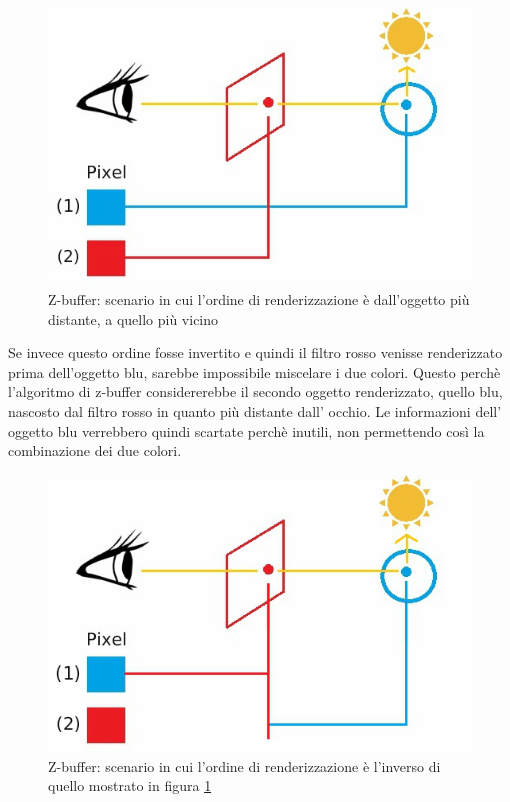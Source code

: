 \begin{figure}[htb]
 \centering
 \includegraphics[width=0.8\linewidth]{images/chapter_stato_arte/stato_arte_zbuffer_1.jpg}\hfill
 \caption[Z-buffer: ordine di renderizzazione corretto]{Z-buffer: scenario in cui l'ordine di renderizzazione è dall'oggetto più distante, a quello più vicino}
 \label{fig:stato_arte_zbuffer_1}
\end{figure}
 
Se invece questo ordine fosse invertito e quindi il filtro rosso venisse renderizzato prima dell’oggetto blu, sarebbe impossibile miscelare i due colori.
Questo perchè l’algoritmo di z-buffer considererebbe il secondo oggetto renderizzato, quello blu, nascosto dal filtro rosso in quanto più distante dall’ occhio. Le informazioni dell’ oggetto blu verrebbero quindi scartate perchè inutili, non permettendo così la combinazione dei due colori.
\\
\begin{figure}[htb]
 \centering
 \includegraphics[width=0.8\linewidth]{images/chapter_stato_arte/stato_arte_zbuffer_2.jpg}\hfill
 \caption[Z-buffer: ordine di renderizzazione errato]{Z-buffer: scenario in cui l'ordine di renderizzazione è l'inverso di quello mostrato in figura \ref{fig:stato_arte_zbuffer_1}}
 \label{fig:stato_arte_zbuffer_2}
\end{figure}

